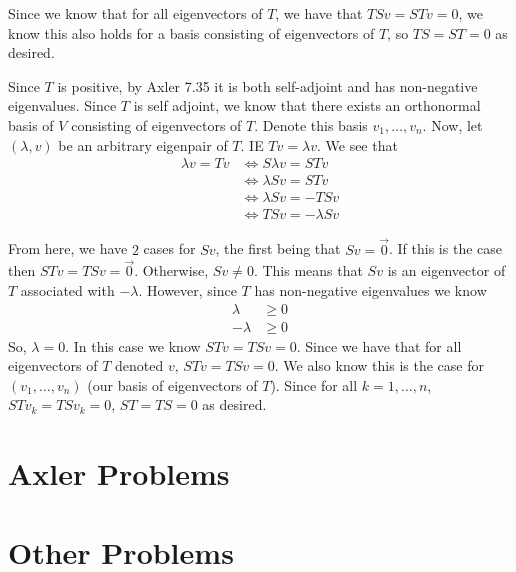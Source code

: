 \documentclass[answers]{exam}
\begin{document}
\begin{questions}
\begin{solution}
        Since we know that for all eigenvectors of $T$, we have that $TSv = STv = 0$, we know this also holds 
        for a basis consisting of eigenvectors of $T$, so $TS=ST=0$ as desired.


         Since $T$ is positive, by Axler 7.35 it is both self-adjoint and has non-negative
        eigenvalues. Since $T$ is self adjoint, we know that there exists an orthonormal basis of $V$ consisting
        of eigenvectors of $T$. Denote this basis $v_1,\dots,v_n$. Now, let $(\lambda,v)$ be an arbitrary 
        eigenpair of $T$. IE $Tv = \lambda v$. We see that
        \begin{align*}
            \lambda v = Tv &\iff S\lambda v = STv \\
            &\iff \lambda Sv = STv \\
            &\iff \lambda Sv = -TSv \\
            &\iff TSv = -\lambda Sv
        \end{align*}

        From here, we have $2$ cases for $Sv$, the first being that $Sv = \vec{0}$. If this is the case then
        $STv = TSv = \vec{0}$. Otherwise, $Sv\neq 0$. This means that $Sv$ is an eigenvector of $T$ associated
        with $-\lambda$. However, since $T$ has non-negative eigenvalues we know
        \begin{align*}
            \lambda &\geq 0 \\
            -\lambda&\geq 0
        \end{align*}
        So, $\lambda = 0$. In this case we know $STv = TSv = 0$. Since we have that for all eigenvectors of $T$
        denoted $v$,
        $STv = TSv = 0$. We also know this is the case for $(v_1,\dots,v_n)$ (our basis of eigenvectors of $T$). 
        Since for all $k=1,\dots,n$, $STv_k = TSv_k = 0$, $ST=TS=0$ as desired.
    \end{solution}
\end{questions}

\section{Axler Problems}
\begin{questions}
\end{questions}

\section{Other Problems}
\begin{questions}
\end{questions}
\end{document}
